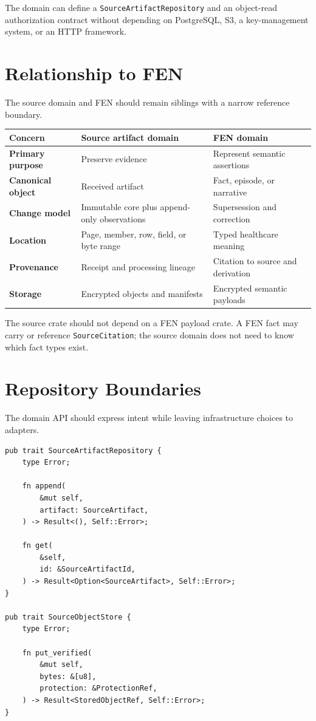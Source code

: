 \documentclass[11pt]{article}
\newcommand{\code}[1]{\texttt{#1}}
\begin{document}
The domain can define a \code{SourceArtifactRepository} and an object-read authorization contract without depending on PostgreSQL, S3, a key-management system, or an HTTP framework.

\section{Relationship to FEN}

The source domain and FEN should remain siblings with a narrow reference boundary.

\begin{center}
\begin{tabularx}{\textwidth}{>{\bfseries}p{} X X}
\toprule
Concern & Source artifact domain & FEN domain \\
\midrule
Primary purpose & Preserve evidence & Represent semantic assertions \\
Canonical object & Received artifact & Fact, episode, or narrative \\
Change model & Immutable core plus append-only observations & Supersession and correction \\
Location & Page, member, row, field, or byte range & Typed healthcare meaning \\
Provenance & Receipt and processing lineage & Citation to source and derivation \\
Storage & Encrypted objects and manifests & Encrypted semantic payloads \\
\bottomrule
\end{tabularx}
\end{center}

The source crate should not depend on a FEN payload crate. A FEN fact may carry or reference \code{SourceCitation}; the source domain does not need to know which fact types exist.

\Needspace{0.52\textheight}
\section{Repository Boundaries}

The domain API should express intent while leaving infrastructure choices to adapters.

\begin{lstlisting}
pub trait SourceArtifactRepository {
    type Error;

    fn append(
        &mut self,
        artifact: SourceArtifact,
    ) -> Result<(), Self::Error>;

    fn get(
        &self,
        id: &SourceArtifactId,
    ) -> Result<Option<SourceArtifact>, Self::Error>;
}

pub trait SourceObjectStore {
    type Error;

    fn put_verified(
        &mut self,
        bytes: &[u8],
        protection: &ProtectionRef,
    ) -> Result<StoredObjectRef, Self::Error>;
}
\end{lstlisting}
\end{document}
